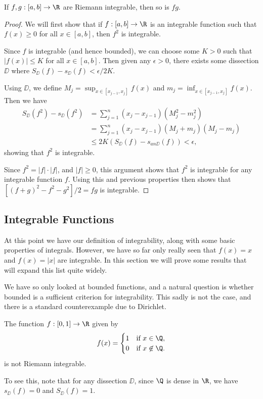 \documentclass[a4paper]{scrartcl}
\begin{document}
\begin{proposition}
	If $f, g : [a, b] \rightarrow \R$ are Riemann integrable, then so is $fg$.
\end{proposition}
\begin{proof}
	We will first show that if $f: [a, b ]\rightarrow \R$ is an integrable function such that $f(x) \geq 0$ for all $x \in [a, b]$, then $f^2$ is integrable. 
	
	Since $f$ is integrable (and hence bounded), we can choose some  $K > 0$ such that $|f(x)| \leq K$ for all $x \in [a, b]$. Then given any $\epsilon> 0$, there exists some dissection $\DD$ where $S_{\DD}(f) - s_{\DD}(f) < \epsilon/2K$.

	Using $\DD$, we define $M_j = \sup_{x \in [x_{j - 1}, x_j]} f(x)$ and $m_j = \inf_{x \in [x_{j - 1}, x_j]} f(x)$. Then we have
	\begin{align*}
		S_\DD(f^2) - s_{\DD}(f^2) &= \sum_{j = 1}^{n} (x_{j} - x_{j - 1}) (M_j^2 - m_j^2) \\
		&= \sum_{j = 1}^{n} (x_{j} - x_{j - 1}) (M_j + m_j) (M_j - m_j)  \\
		&\leq  2K (S_\DD(f) - s_{an\DD}(f)) < \epsilon,
	\end{align*}
	showing that $f^2$ is integrable.

	Since $f^2 = |f| \cdot |f|$, and $|f| \geq 0$, this argument shows that $f^2$ is integrable for any integrable function $f$.
	Using this and previous properties then shows that $[(f + g)^2 - f^2 - g^2]/2 = fg$ is integrable.
\end{proof}

\subsection{Integrable Functions}

At this point we have our definition of integrability, along with some basic properties of integrals. However, we have so far only really seen that $f(x) = x$ and $f(x) = |x|$ are integrable. In this section we will prove some results that will expand this list quite widely.

We have so only looked at bounded functions, and a natural question is whether bounded is a sufficient criterion for integrability.
This sadly is not the case, and there is a standard counterexample due to Dirichlet.

\begin{example}
The function $f:[0, 1] \rightarrow \R$ given by
$$
f(x) = \begin{cases}
	1 &\mbox{if } x \in \Q, \\
	0 &\mbox{if } x \not\in \Q.
	\end{cases}
$$
is not Riemann integrable.

To see this, note that for any dissection $\DD$, since $\Q$ is dense in $\R$, we have $s_{\DD}(f) = 0$ and $S_{\DD}(f) = 1$.
 \end{example}
\end{document}
